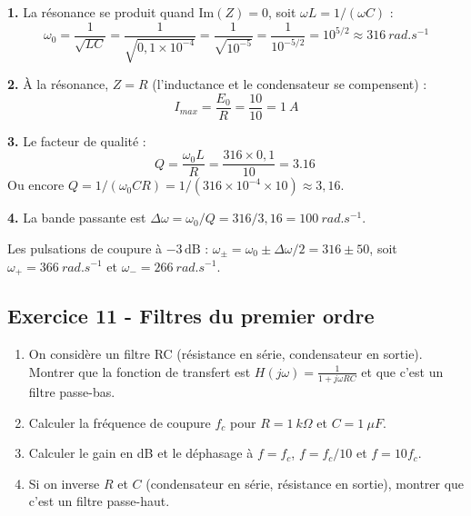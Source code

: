 \documentclass[12pt,a4paper]{article}
\begin{document}
\begin{boitecorrige}
\textbf{1.} La résonance se produit quand $\text{Im}(Z) = 0$, soit $\omega L = 1/(\omega C)$ :
\[
\omega_0 = \frac{1}{\sqrt{LC}} = \frac{1}{\sqrt{0{,}1\times10^{-4}}} = \frac{1}{\sqrt{10^{-5}}} = \frac{1}{10^{-5/2}} = 10^{5/2} \approx \qty{316}{rad.s^{-1}}
\]

\textbf{2.} À la résonance, $Z = R$ (l'inductance et le condensateur se compensent) :
\[
I_{max} = \frac{E_0}{R} = \frac{10}{10} = \qty{1}{A}
\]

\textbf{3.} Le facteur de qualité :
\[
Q = \frac{\omega_0 L}{R} = \frac{316\times0{,}1}{10} = \qty{3.16}{}
\]
Ou encore $Q = 1/(\omega_0 CR) = 1/(316\times10^{-4}\times10) \approx 3{,}16$.

\textbf{4.} La bande passante est $\Delta\omega = \omega_0/Q = 316/3{,}16 = \qty{100}{rad.s^{-1}}$.

Les pulsations de coupure à $-3\,\text{dB}$ : $\omega_\pm = \omega_0\pm\Delta\omega/2 = 316\pm50$, soit $\omega_+ = \qty{366}{rad.s^{-1}}$ et $\omega_- = \qty{266}{rad.s^{-1}}$.
\end{boitecorrige}

\subsection*{Exercice 11 - Filtres du premier ordre \niveau{\moyen}}

\begin{boiteexercice}
\begin{enumerate}
  \item On considère un filtre RC (résistance en série, condensateur en sortie). Montrer que la fonction de transfert est $H(j\omega) = \frac{1}{1+j\omega RC}$ et que c'est un filtre passe-bas.
  \item Calculer la fréquence de coupure $f_c$ pour $R = \qty{1}{k\Omega}$ et $C = \qty{1}{\mu F}$.
  \item Calculer le gain en dB et le déphasage à $f = f_c$, $f = f_c/10$ et $f = 10f_c$.
  \item Si on inverse $R$ et $C$ (condensateur en série, résistance en sortie), montrer que c'est un filtre passe-haut.
\end{enumerate}
\end{boiteexercice}
\end{document}
